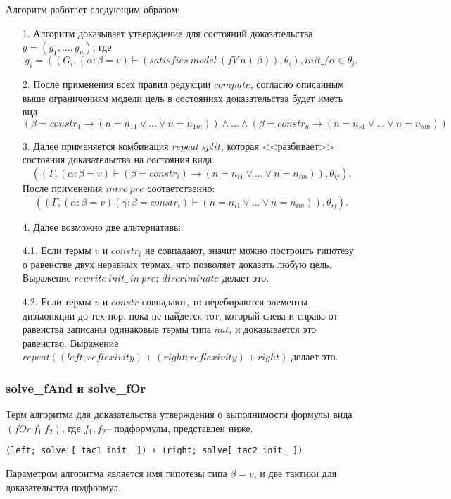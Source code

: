 \documentclass[12pt]{article}
\begin{document}
Алгоритм работает следующим образом:
\begin{enumerate}
    \item[1.] Алгоритм доказывает утверждение для состояний доказательства $g = (g_1, ..., g_n)$, где 
    $$g_i = ((G_i, (\alpha: \beta = v) \vdash (satisfies\ model\ (fV\ n)\ \beta)), \theta_i), init\_/\alpha \in \theta_i.$$ 
    \item[2.]  После применения всех правил редукции $compute$, согласно описанным выше ограничениям модели цель в состояниях доказательства будет иметь вид 
    $$(\beta=constr_1 \xrightarrow{} (n=n_{11} \vee ... \vee n=n_{1m})) \wedge ... \wedge (\beta=constr_n \xrightarrow{} (n=n_{s1} \vee ... \vee n=n_{sm})) $$
    \item[3.] Далее применяется комбинация $repeat\ split$, которая <<разбивает>> состояния доказательства на состояния вида
    $$((\Gamma, (\alpha: \beta = v) \vdash (\beta=constr_i) \xrightarrow{} (n=n_{i1} \vee ... \vee n=n_{im})), \theta_{ij}).$$
    После применения $intro\ pre$ соответственно:
    $$((\Gamma,  (\alpha: \beta = v) (\gamma: \beta=constr_i) \vdash (n=n_{i1} \vee ... \vee n=n_{im})), \theta_{ij}).$$
    \item[4.] Далее возможно две альтернативы:
    \item[] 4.1. Если термы $v$ и $constr_i$ не совпадают, значит можно построить гипотезу о равенстве двух неравных термах, что позволяет доказать любую цель. Выражение $rewrite\ init\_\ in\ pre;\ discriminate$ делает это.
    \item[] 4.2. Если термы $v$ и $constr$ совпадают, то перебираются элементы дизъюнкции до тех пор, пока не найдется тот, который слева и справа от равенства записаны одинаковые термы типа $nat$, и доказывается это равенство. Выражение $repeat ( (left; reflexivity) + (right; reflexivity) + right)$ делает это.
    
\end{enumerate}

\subsubsection{solve\_fAnd и solve\_fOr}
Терм алгоритма для доказательства утверждения о выполнимости формулы вида $(fOr\ f_1\ f_2)$, где $f_1, f_2$-- подформулы, представлен ниже.
\begin{verbatim}
(left; solve [ tac1 init_ ]) + (right; solve[ tac2 init_ ]) 
\end{verbatim}
Параметром алгоритма является имя гипотезы типа $\beta = v$, и две тактики для доказательства подформул.
\end{document}
